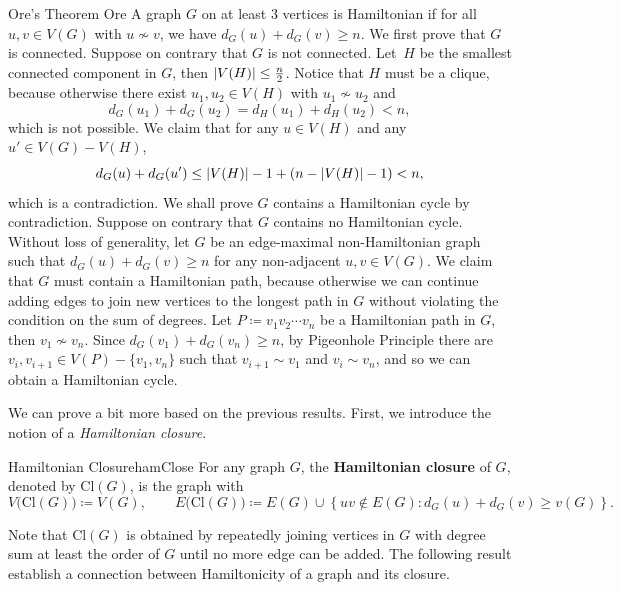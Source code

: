 \documentclass[math]{amznotes}
\theoremstyle{remark}
\newcommand{\0}{\mathbf{0}}
\newcommand{\1}{\mathbf{1}}
\begin{document}
\begin{thmbox}{Ore's Theorem} {Ore}
    A graph $G$ on at least $3$ vertices is Hamiltonian if for all $u, v \in V(G)$ with $u \not\sim v$, we have $d_G(u) + d_G(v) \geq n$.
    \tcblower
    We first prove that $G$ is connected. Suppose on contrary that $G$ is not connected. Let~$H$ be the smallest connected component in $G$, then ${\left\lvert {V(H)} \right\rvert} \leq \frac{n}{2}$. Notice that $H$ must be a clique, because otherwise there exist $u_1, u_2 \in V(H)$ with $u_1 \not\sim u_2$ and
    \begin{equation*}
        d_G(u_1) + d_G(u_2) = d_H(u_1) + d_H(u_2) < n,
    \end{equation*}
    which is not possible. We claim that for any $u \in V(H)$ and any $u' \in V(G) - V(H)$, 
    \begin{equation*}
        d_G(u) + d_G(u') \leq {\left\lvert {V(H)} \right\rvert} - 1 + \left(n - {\left\lvert {V(H)} \right\rvert} - 1\right) < n,
    \end{equation*}
    which is a contradiction. We shall prove $G$ contains a Hamiltonian cycle by contradiction. Suppose on contrary that $G$ contains no Hamiltonian cycle. Without loss of generality, let $G$ be an edge-maximal non-Hamiltonian graph such that $d_G(u) + d_G(v) \geq n$ for any non-adjacent $u, v \in V(G)$. We claim that $G$ must contain a Hamiltonian path, because otherwise we can continue adding edges to join new vertices to the longest path in $G$ without violating the condition on the sum of degrees. Let $P \coloneqq v_1v_2\cdots v_n$ be a Hamiltonian path in $G$, then $v_1 \not\sim v_n$. Since $d_G(v_1) + d_G(v_n) \geq n$, by Pigeonhole Principle there are $v_i, v_{i + 1} \in V(P) - \{v_1, v_n\}$ such that $v_{i + 1} \sim v_1$ and $v_i \sim v_n$, and so we can obtain a Hamiltonian cycle.
\end{thmbox}
We can prove a bit more based on the previous results. First, we introduce the notion of a \textit{Hamiltonian closure}.
\begin{dfnbox}{Hamiltonian Closure}{hamClose}
    For any graph $G$, the {\color{red} \textbf{Hamiltonian closure}} of $G$, denoted by $\mathrm{Cl}(G)$, is the graph with
    \begin{equation*}
        V\bigl(\mathrm{Cl}(G)\bigr) \coloneqq V(G), \qquad E\bigl(\mathrm{Cl}(G)\bigr) \coloneqq E(G) \cup \left\{uv \notin E(G) \colon d_G(u) + d_G(v) \geq v(G)\right\}.
    \end{equation*}
\end{dfnbox}
Note that $\mathrm{Cl}(G)$ is obtained by repeatedly joining vertices in $G$ with degree sum at least the order of $G$ until no more edge can be added. The following result establish a connection between Hamiltonicity of a graph and its closure.
\end{document}
